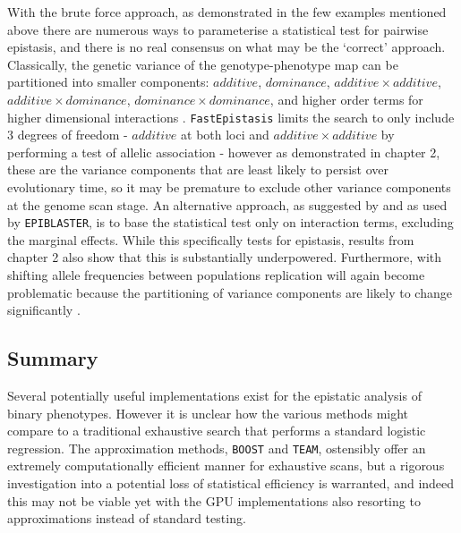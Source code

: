 With the brute force approach, as demonstrated in the few examples mentioned above there are numerous ways to parameterise a statistical test for pairwise epistasis, and there is no real consensus on what may be the `correct' approach. Classically, the genetic variance of the genotype-phenotype map can be partitioned into smaller components: $additive$, $dominance$, $additive \times additive$, $additive \times dominance$, $dominance \times dominance$, and higher order terms for higher dimensional interactions \citep{Cockerham1954, Jana1971}. {\tt FastEpistasis} limits the search to only include 3 degrees of freedom - $additive$ at both loci and $additive \times additive$ by performing a test of allelic association - however as demonstrated in chapter 2, these are the variance components that are least likely to persist over evolutionary time, so it may be premature to exclude other variance components at the genome scan stage. An alternative approach, as suggested by \cite{Cordell2002} and as used by {\tt EPIBLASTER}, is to base the statistical test only on interaction terms, excluding the marginal effects. While this specifically tests for epistasis, results from chapter 2 also show that this is substantially underpowered. Furthermore, with shifting allele frequencies between populations replication will again become problematic because the partitioning of variance components are likely to change significantly \citep{Greene2009}. 

\subsection{Summary}

Several potentially useful implementations exist for the epistatic analysis of binary phenotypes. However it is unclear how the various methods might compare to a traditional exhaustive search that performs a standard logistic regression. The approximation methods, {\tt BOOST} and {\tt TEAM}, ostensibly offer an extremely computationally efficient manner for exhaustive scans, but a rigorous investigation into a potential loss of statistical efficiency is warranted, and indeed this may not be viable yet with the GPU implementations also resorting to approximations instead of standard testing.

